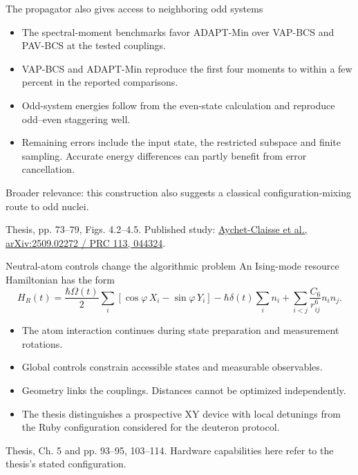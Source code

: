 \documentclass[11pt,aspectratio=169]{beamer}
\newcommand{\src}[1]{\par\vfill{\fontsize{7}{8}\selectfont\color{gray}#1\par}}
\begin{document}
\begin{frame}{The propagator also gives access to neighboring odd systems}
\begin{itemize}\setlength\itemsep{.7em}
\item The spectral-moment benchmarks favor ADAPT-Min over VAP-BCS and PAV-BCS at the tested couplings.
\item VAP-BCS and ADAPT-Min reproduce the first four moments to within a few percent in the reported comparisons.
\item Odd-system energies follow from the even-state calculation and reproduce odd--even staggering well.
\item Remaining errors include the input state, the restricted subspace and finite sampling. Accurate energy differences can partly benefit from error cancellation.
\end{itemize}
\medskip
\alert{Broader relevance:} this construction also suggests a classical configuration-mixing route to odd nuclei.
\src{Thesis, pp. 73--79, Figs. 4.2--4.5. Published study: \href{https://arxiv.org/abs/2509.02272}{Aychet-Claisse et al., arXiv:2509.02272 / PRC 113, 044324}.}
\end{frame}

\begin{frame}{Neutral-atom controls change the algorithmic problem}
An Ising-mode resource Hamiltonian has the form
\[
H_R(t)=\frac{\hbar\Omega(t)}2\sum_i[\cos\varphi\,X_i-\sin\varphi\,Y_i]
-\hbar\delta(t)\sum_i n_i+\sum_{i<j}\frac{C_6}{r_{ij}^6}n_i n_j .
\]
\begin{itemize}\setlength\itemsep{.6em}
\item The atom interaction continues during state preparation and measurement rotations.
\item Global controls constrain accessible states and measurable observables.
\item Geometry links the couplings. Distances cannot be optimized independently.
\item The thesis distinguishes a prospective XY device with local detunings from the Ruby configuration considered for the deuteron protocol.
\end{itemize}
\src{Thesis, Ch. 5 and pp. 93--95, 103--114. Hardware capabilities here refer to the thesis's stated configuration.}
\end{frame}
\end{document}
